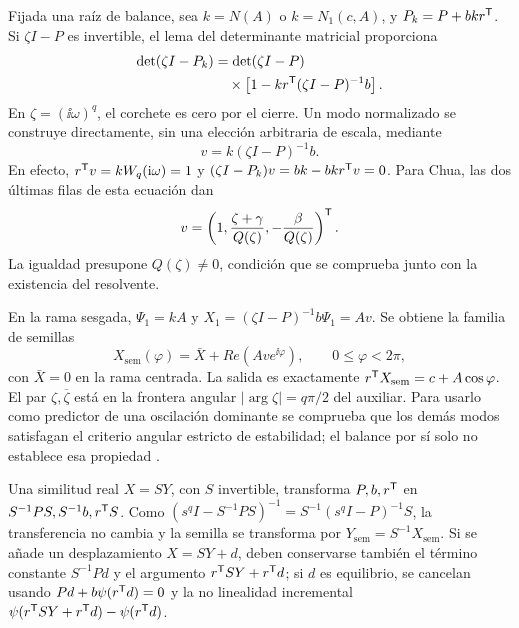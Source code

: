 Fijada una raíz de balance, sea \(k=N(A)\) o \(k=N_1(c,A)\), y
\(P_k=P+bkr^{\mathsf T}\). Si \(\zeta I-P\) es invertible, el lema del
determinante matricial proporciona
\begin{equation}
 \begin{aligned}
 \det(\zeta I-P_k)
 &=\det(\zeta I-P)\\
 &\quad\times\left[1-kr^{\mathsf T}(\zeta I-P)^{-1}b\right].
 \end{aligned}
 \label{bre:bal:det-lemma}
\end{equation}
En \(\zeta=(\ii\omega)^q\), el corchete es cero por el cierre.
Un modo normalizado se construye directamente, sin una elección
arbitraria de escala, mediante
\begin{equation}
 v=k(\zeta I-P)^{-1}b.
 \label{bre:bal:mode}
\end{equation}
En efecto, \(r^{\mathsf T}v=kW_q(\mathrm i\omega)=1\) y
\((\zeta I-P_k)v=bk-bkr^{\mathsf T}v=0\).
Para Chua, las dos últimas filas de esta ecuación dan
\begin{equation}
 v=\left(1,\frac{\zeta+\gamma}{Q(\zeta)},
               -\frac\beta{Q(\zeta)}\right)^{\mathsf T}.
 \label{bre:bal:chua-mode}
\end{equation}
La igualdad presupone \(Q(\zeta)\ne0\), condición que se comprueba
junto con la existencia del resolvente.

En la rama sesgada, \(\Psi_1=kA\) y
\(X_1=(\zeta I-P)^{-1}b\Psi_1=Av\). Se obtiene la familia de semillas
\begin{equation}
 X_{\mathrm{sem}}(\varphi)=\bar X+Re(Av e^{\ii\varphi}),
 \qquad 0\leq\varphi<2\pi,
 \label{bre:bal:seed}
\end{equation}
con \(\bar X=0\) en la rama centrada. La salida es exactamente
\(r^{\mathsf T}X_{\mathrm{sem}}=c+A\cos\varphi\). El par
\(\zeta,\overline\zeta\) está en la frontera angular
\(|\arg\zeta|=q\pi/2\) del auxiliar. Para usarlo como predictor de
una oscilación dominante se comprueba que los demás modos satisfagan el
criterio angular estricto de estabilidad; el balance por sí solo no
establece esa propiedad \cite{Matignon1996}.

Una similitud real \(X=SY\), con \(S\) invertible, transforma
\(P,b,r^{\mathsf T}\) en \(S^{-1}PS,S^{-1}b,r^{\mathsf T}S\).
Como
\((s^qI-S^{-1}PS)^{-1}=S^{-1}(s^qI-P)^{-1}S\),
la transferencia no cambia y la semilla se transforma por
\(Y_{\mathrm{sem}}=S^{-1}X_{\mathrm{sem}}\).
Si se añade un desplazamiento \(X=SY+d\), deben conservarse también
el término constante \(S^{-1}Pd\) y el argumento
\(r^{\mathsf T}SY+r^{\mathsf T}d\); si \(d\) es equilibrio, se cancelan usando
\(Pd+b\psi(r^{\mathsf T}d)=0\) y la no linealidad incremental
\(\psi(r^{\mathsf T}SY+r^{\mathsf T}d)-\psi(r^{\mathsf T}d)\).


